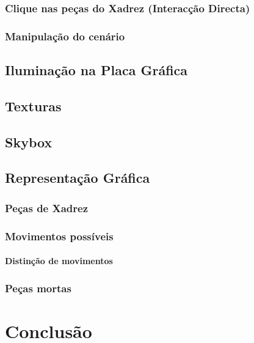 \documentclass[11pt,a4paper]{report}
\begin{document}
\subsection{Clique nas peças do Xadrez (Interacção Directa)}

\subsection{Manipulação do cenário}

\section{Iluminação na Placa Gráfica}

\section{Texturas}

\section{Skybox}

\section{Representação Gráfica}

\subsection{Peças de Xadrez}

\subsection{Movimentos possíveis}

\subsubsection{Distinção de movimentos}

\subsection{Peças mortas}

\chapter{Conclusão}
%




%
%

\listoffigures

\end{document}

